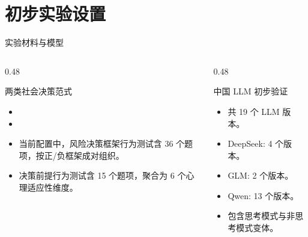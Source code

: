 \section{初步实验设置}

\begin{frame}{实验材料与模型}
  \begin{columns}[T,totalwidth=\textwidth]
    \begin{column}{0.48\textwidth}
      \begin{block}{两类社会决策范式}
        \begin{itemize}
          \item {}
          \item {}
        \end{itemize}
      \end{block}

      \vspace{0.5em}
      \begin{itemize}
        \item 当前配置中，风险决策框架行为测试含 36 个题项，按正/负框架成对组织。
        \item 决策前提行为测试含 15 个题项，聚合为 6 个心理适应性维度。
      \end{itemize}
    \end{column}
    \begin{column}{0.48\textwidth}
      \begin{block}{中国 LLM 初步验证}
        \begin{itemize}
          \item 共 19 个 LLM 版本。
          \item DeepSeek: 4 个版本。
          \item GLM: 2 个版本。
          \item Qwen: 13 个版本。
          \item 包含思考模式与非思考模式变体。
        \end{itemize}
      \end{block}
    \end{column}
  \end{columns}

  \vspace{0.4em}
\end{frame}

